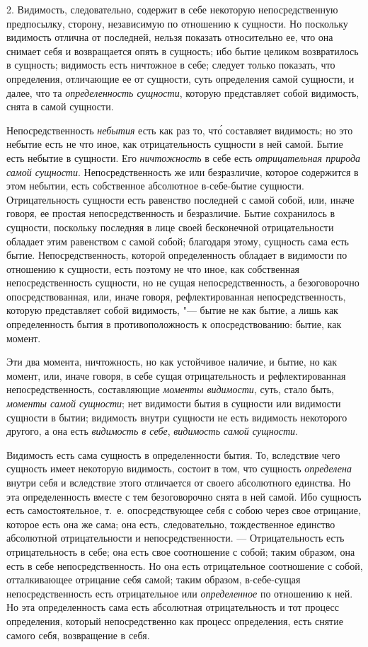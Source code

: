 2. Видимость, следовательно, содержит в себе некоторую непосредственную
предпосылку, сторону, независимую по отношению к сущности. Но поскольку
видимость отлична от последней, нельзя показать относительно ее, что она
снимает себя и возвращается опять в сущность; ибо бытие целиком
возвратилось в сущность; видимость есть ничтожное в себе; следует только
показать, что определения, отличающие ее от сущности, суть определения
самой сущности, и далее, что та {\em определенность
сущности}, которую представляет собой видимость, снята в самой сущности.

Непосредственность {\em небытия} есть как раз то, чт\'{о}
составляет видимость; но это небытие есть не что иное, как отрицательность
сущности в ней самой. Бытие есть небытие в сущности. Его
{\em ничтожность} в себе есть
{\em отрицательная природа самой сущности}.
Непосредственность же или безразличие, которое содержится в этом небытии,
есть собственное абсолютное в-себе-бытие сущности. Отрицательность сущности
есть равенство последней с самой собой, или, иначе говоря, ее простая
непосредственность и безразличие. Бытие сохранилось в сущности, поскольку
последняя в лице своей бесконечной отрицательности обладает этим равенством
с самой собой; благодаря этому, сущность сама есть бытие.
Непосредственность, которой определенность обладает в видимости по
отношению к сущности, есть поэтому не что иное, как собственная
непосредственность сущности, но не сущая непосредственность, а
безоговорочно опосредствованная, или, иначе говоря, рефлектированная
непосредственность, которую представляет собой видимость, "--- бытие не как
бытие, а лишь как определенность бытия в противоположность к
опосредствованию: бытие, как момент.

Эти два момента, ничтожность, но как устойчивое наличие, и бытие, но как
момент, или, иначе говоря, в себе сущая отрицательность и рефлектированная
непосредственность, составляющие {\em моменты
видимости}, суть, стало быть, {\em моменты самой
сущности}; нет видимости бытия в сущности или видимости сущности в бытии;
видимость внутри сущности не есть видимость некоторого другого, а она есть
{\em видимость в себе},
{\em видимость самой сущности}.

Видимость есть сама сущность в определенности бытия. То, вследствие чего
сущность имеет некоторую видимость, состоит в том, что сущность
{\em определена} внутри себя и вследствие этого
отличается от своего абсолютного единства. Но эта определенность вместе с
тем безоговорочно снята в ней самой. Ибо сущность есть самостоятельное,
т.~е. опосредствующее себя с собою через свое отрицание, которое есть она
же сама; она есть, следовательно, тождественное единство абсолютной
отрицательности и непосредственности. --- Отрицательность есть
отрицательность в себе; она есть свое соотношение с собой; таким образом,
она есть в себе непосредственность. Но она есть отрицательное соотношение с
собой, отталкивающее отрицание себя самой; таким образом, в-себе-сущая
непосредственность есть отрицательное или
{\em определенное} по отношению к ней. Но эта
определенность сама есть абсолютная отрицательность и тот процесс
определения, который непосредственно как процесс определения, есть снятие
самого себя, возвращение в себя.

